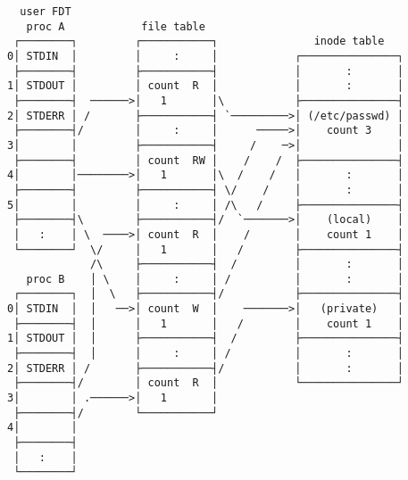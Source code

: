 \documentclass[varwidth=40em,crop]{standalone}
\begin{document}
\begin{verbatim}
  user FDT
   proc A            file table
 ┌────────┐         ┌───────────┐               inode table
0│ STDIN  │         │     :     │            ┌───────────────┐
 ├────────┤         ├───────────┤            │       :       │
1│ STDOUT │         │ count  R  │            │       :       │
 ├────────┤  ──────>│   1       │\           ├───────────────┤
2│ STDERR │ /       ├───────────┤ `─────────>│ (/etc/passwd) │
 ├────────┤/        │     :     │      ─────>│    count 3    │
3│        │         ├───────────┤     /    ─>│               │
 ├────────┤         │ count  RW │    /    /  ├───────────────┤
4│        │────────>│   1       │\  /    /   │       :       │
 ├────────┤         ├───────────┤ \/    /    │       :       │
5│        │         │     :     │ /\   /     ├───────────────┤
 ├────────┤\        ├───────────┤/  `───────>│    (local)    │
 │   :    │ \  ────>│ count  R  │    /       │    count 1    │
 └────────┘  \/     │   1       │   /        ├───────────────┤
             /\     ├───────────┤  /         │       :       │
   proc B    │ \    │     :     │ /          │       :       │
 ┌────────┐  │  \   ├───────────┤/           ├───────────────┤
0│ STDIN  │  │   ──>│ count  W  │    ───────>│   (private)   │
 ├────────┤  │      │   1       │   /        │    count 1    │
1│ STDOUT │  │      ├───────────┤  /         ├───────────────┤
 ├────────┤  │      │     :     │ /          │       :       │
2│ STDERR │ /       ├───────────┤/           │       :       │
 ├────────┤/        │ count  R  │            └───────────────┘
3│        │ .──────>│   1       │
 ├────────┤/        └───────────┘
4│        │
 ├────────┤
 │   :    │
 └────────┘
\end{verbatim}
\end{document}
